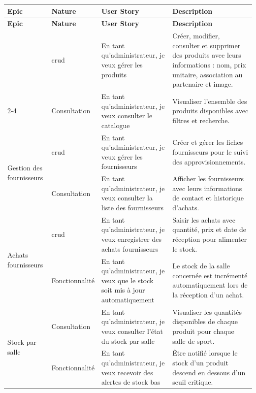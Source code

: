 ﻿\documentclass[../main.tex]{subfiles}
\begin{document}
\begin{longtable}{|p{2.3cm}|p{2.8cm}|p{3.7cm}|p{5.2cm}|}
\hline
\textbf{Epic} & \textbf{Nature} & \textbf{User Story} & \textbf{Description} \\
\hline
\endfirsthead
\hline
\textbf{Epic} & \textbf{Nature} & \textbf{User Story} & \textbf{Description} \\
\hline
\endhead
\hline
\endfoot

\multirow{2}{*}{\parbox{2.5cm}{Gestion des produits}} & \acrshort{crud} & En tant qu'administrateur, je veux g\'{e}rer les produits & Cr\'{e}er, modifier, consulter et supprimer des produits avec leurs informations : nom, prix unitaire, association au partenaire et image. \\
\cline{2-4}
 & Consultation & En tant qu'administrateur, je veux consulter le catalogue & Visualiser l'ensemble des produits disponibles avec filtres et recherche. \\
\hline

\multirow{2}{*}{\parbox{2.5cm}{Gestion des fournisseurs}} & \acrshort{crud} & En tant qu'administrateur, je veux g\'{e}rer les fournisseurs & Cr\'{e}er et g\'{e}rer les fiches fournisseurs pour le suivi des approvisionnements. \\
\cline{2-4}
 & Consultation & En tant qu'administrateur, je veux consulter la liste des fournisseurs & Afficher les fournisseurs avec leurs informations de contact et historique d'achats. \\
\hline

\multirow{2}{*}{\parbox{2.5cm}{Achats fournisseurs}} & \acrshort{crud} & En tant qu'administrateur, je veux enregistrer des achats fournisseurs & Saisir les achats avec quantit\'{e}, prix et date de r\'{e}ception pour alimenter le stock. \\
\cline{2-4}
 & Fonctionnalit\'{e} & En tant qu'administrateur, je veux que le stock soit mis \`{a} jour automatiquement & Le stock de la salle concern\'{e}e est incr\'{e}ment\'{e} automatiquement lors de la r\'{e}ception d'un achat. \\
\hline

\multirow{2}{*}{\parbox{2.5cm}{Stock par salle}} & Consultation & En tant qu'administrateur, je veux consulter l'\'{e}tat du stock par salle & Visualiser les quantit\'{e}s disponibles de chaque produit pour chaque salle de sport. \\
\cline{2-4}
 & Fonctionnalit\'{e} & En tant qu'administrateur, je veux recevoir des alertes de stock bas & \^{E}tre notifi\'{e} lorsque le stock d'un produit descend en dessous d'un seuil critique. \\
\hline


\end{longtable}
\end{document}
